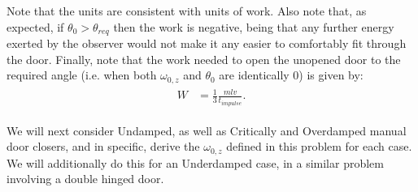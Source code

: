     Note that the units are consistent with units of work. Also note that, as expected, if $\theta_{0}>\theta_{req}$ then the work is negative, being that any further energy exerted by the observer would not make it any easier to comfortably fit through the door. Finally, note that the work needed to open the unopened door to the required angle (i.e. when both $\omega_{0,z}$ and $\theta_{0}$ are identically 0) is given by:
    \begin{eqnarray}
    \begin{split}
        W & = \frac{1}{3}\frac{mlv}{t_{impulse}}.
    \end{split}
    \end{eqnarray}\par
    We will next consider Undamped, as well as Critically and Overdamped manual door closers, and in specific, derive the $\omega_{0,z}$ defined in this problem for each case. We will additionally do this for an Underdamped case, in a similar problem involving a double hinged door.
